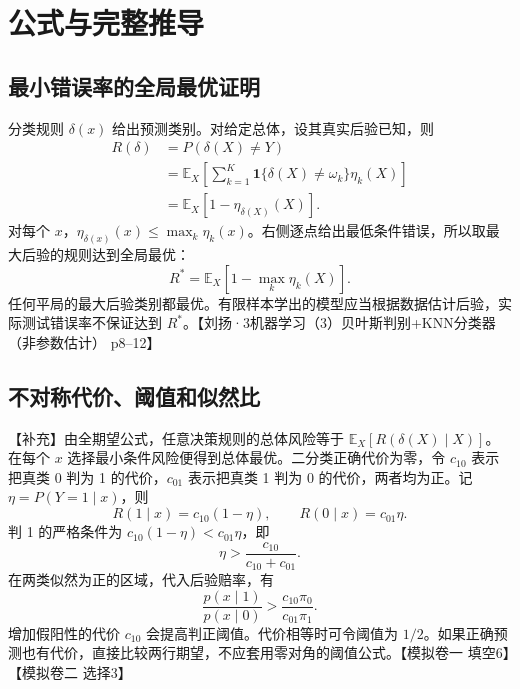 \documentclass[UTF8,a4paper,zihao=-4,fontset=fandol]{ctexrep}
\begin{document}
\section{公式与完整推导}
\subsection*{最小错误率的全局最优证明}
分类规则 $\delta(x)$ 给出预测类别。对给定总体，设其真实后验已知，则
\begin{align*}
 R(\delta)
 &=P(\delta(X)\ne Y)\\
 &=\mathbb E_X\!\left[
   \sum_{k=1}^K\mathbf 1\{\delta(X)\ne \omega_k\}\eta_k(X)
   \right]\\
 &=\mathbb E_X[1-\eta_{\delta(X)}(X)].
\end{align*}
对每个 $x$，$\eta_{\delta(x)}(x)\le\max_k\eta_k(x)$。右侧逐点给出最低条件错误，所以取最大后验的规则达到全局最优：
\[
 R^*=\mathbb E_X[1-\max_k\eta_k(X)].
\]
任何平局的最大后验类别都最优。有限样本学出的模型应当根据数据估计后验，实际测试错误率不保证达到 $R^*$。【刘扬·3机器学习（3）贝叶斯判别+KNN分类器（非参数估计） p8–12】

\subsection*{不对称代价、阈值和似然比}
【补充】由全期望公式，任意决策规则的总体风险等于 $\mathbb E_X[R(\delta(X)\mid X)]$。在每个 $x$ 选择最小条件风险便得到总体最优。二分类正确代价为零，令 $c_{10}$ 表示把真类 0 判为 1 的代价，$c_{01}$ 表示把真类 1 判为 0 的代价，两者均为正。记 $\eta=P(Y=1\mid x)$，则
\[
 R(1\mid x)=c_{10}(1-\eta),\qquad
 R(0\mid x)=c_{01}\eta.
\]
判 1 的严格条件为 $c_{10}(1-\eta)<c_{01}\eta$，即
\[
 \eta>\frac{c_{10}}{c_{10}+c_{01}}.
\]
在两类似然为正的区域，代入后验赔率，有
\[
 \frac{p(x\mid 1)}{p(x\mid0)}>
 \frac{c_{10}\pi_0}{c_{01}\pi_1}.
\]
增加假阳性的代价 $c_{10}$ 会提高判正阈值。代价相等时可令阈值为 $1/2$。如果正确预测也有代价，直接比较两行期望，不应套用零对角的阈值公式。【模拟卷一 填空6】【模拟卷二 选择3】
\end{document}
